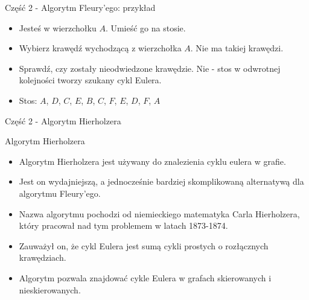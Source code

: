 \documentclass[polish,envcountsect,10pt]{beamer}
\begin{document}
\begin{frame}{Część 2 - Algorytm Fleury'ego: przykład}
    \begin{itemize}
        \item Jesteś w wierzchołku $A$. Umieść go na stosie.
        \item Wybierz krawędź wychodzącą z wierzchołka $A$. Nie ma takiej krawędzi.
        \item Sprawdź, czy zostały nieodwiedzone krawędzie. Nie - stos w odwrotnej kolejności tworzy szukany cykl Eulera.
        \item Stos: $A$, $D$, $C$, $E$, $B$, $C$, $F$, $E$, $D$, $F$, $A$
    \end{itemize}
    \begin{center}
    \end{center}
\end{frame}

\begin{frame}{Część 2 - Algorytm Hierholzera}
    \begin{block}{Algorytm Hierholzera}
        \begin{itemize}
            \item Algorytm Hierholzera jest używany do znalezienia cyklu eulera w grafie.
            \item Jest on wydajniejszą, a jednocześnie bardziej skomplikowaną alternatywą dla algorytmu Fleury'ego.
            \item Nazwa algorytmu pochodzi od niemieckiego matematyka Carla Hierholzera, który pracował nad tym problemem w latach 1873-1874.
            \item Zauważył on, że cykl Eulera jest sumą cykli prostych o rozłącznych krawędziach.
            \item Algorytm pozwala znajdować cykle Eulera w grafach skierowanych i nieskierowanych.
        \end{itemize}
    \end{block}
\end{frame}
    
\end{document}
